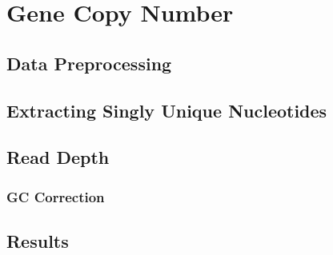 \chapter{Gene Copy Number}
\newpage
\section{Data Preprocessing}
\section{Extracting Singly Unique Nucleotides}
\section{Read Depth}
\subsection{GC Correction}
\section{Results}
